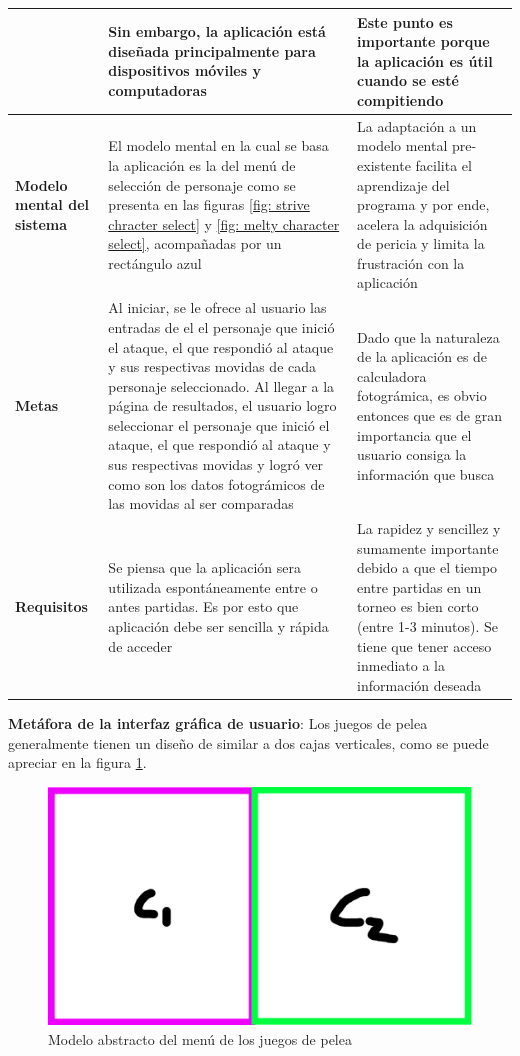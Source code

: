 \begin{tabularx}{\textwidth}{| X |  X |  X |}
    & Sin embargo, la aplicación está diseñada principalmente para dispositivos móviles y computadoras & Este punto es importante porque la aplicación es útil cuando se esté compitiendo\\
    \hline \textbf{Modelo mental del sistema} & El modelo mental en la cual se basa la aplicación es la del menú de selección de personaje como se presenta en las figuras \ref{fig: strive chracter select} y \ref{fig: melty character select}, acompañadas por un rectángulo azul & La adaptación a un modelo mental pre-existente facilita el aprendizaje del programa y por ende, acelera la adquisición de pericia y limita la frustración con la aplicación  \\ 
    \hline \textbf{Metas} & Al iniciar, se le ofrece al usuario las entradas de el el personaje que inició el ataque, el que respondió al ataque y sus respectivas movidas de cada personaje seleccionado. Al llegar a la página de resultados, el usuario logro seleccionar el personaje que inició el ataque, el que respondió al ataque y sus respectivas movidas y logró ver como son los datos fotográmicos de las movidas al ser comparadas & Dado que la naturaleza de la aplicación es de calculadora fotográmica, es obvio entonces que es de gran importancia que el usuario consiga la información que busca \\ 
    \hline \textbf{Requisitos} & Se piensa que la aplicación sera utilizada espontáneamente entre o antes partidas. Es por esto que aplicación debe ser sencilla y rápida de acceder & La rapidez y sencillez y sumamente importante debido a que el tiempo entre partidas en un torneo es bien corto (entre 1-3 minutos). Se tiene que tener acceso inmediato a la información deseada\\ 
    \hline
\end{tabularx}

\textbf{Metáfora de la interfaz gráfica de usuario}: Los juegos de pelea generalmente tienen un diseño de similar a dos cajas verticales, como se puede apreciar en la figura \ref{fig: abstract model}.

\begin{figure}[ht!]
    \centering
    \includegraphics[height=0.2\textwidth]{figures/abstract-design.jpg}
    \caption{Modelo abstracto del menú de los juegos de pelea}
    \label{fig: abstract model}
\end{figure}

